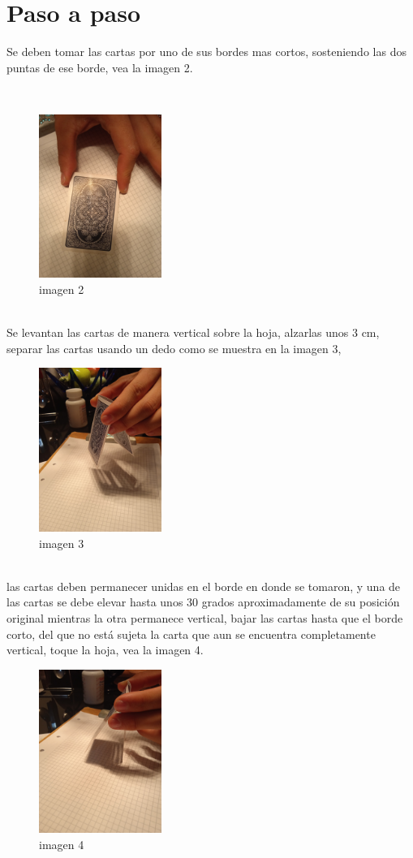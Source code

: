 \documentclass{article}
\begin{document}
\section{Paso a paso} \label{contenido}
Se deben tomar las cartas por uno de sus bordes mas cortos, sosteniendo las dos puntas de ese borde, vea la imagen 2. 

\\

\begin{figure}[h]
\includegraphics[width=4cm]{imagen 2.png}
\centering
\caption{imagen 2}
\label{fig:cpplogo}
\end{figure}
\\
Se levantan las cartas de manera vertical sobre la hoja, alzarlas unos 3 cm, separar las cartas usando un dedo como se muestra en la imagen 3,
\\
\begin{figure}[h]
\includegraphics[width=4cm]{imagen 3.png}
\centering
\caption{imagen 3}
\label{fig:cpplogo}
\end{figure}
\\
las cartas deben permanecer unidas en el borde en donde se tomaron, y una de las cartas se debe elevar hasta unos 30 grados aproximadamente de su posición original mientras la otra permanece vertical, bajar las cartas hasta que el borde corto, del que no está sujeta la carta que aun se encuentra completamente vertical, toque la hoja, vea la imagen 4.
\\
\begin{figure}[h]
\includegraphics[width=4cm]{imagen 4.png}
\centering
\caption{imagen 4}
\label{fig:cpplogo}
\end{figure}
\end{document}
